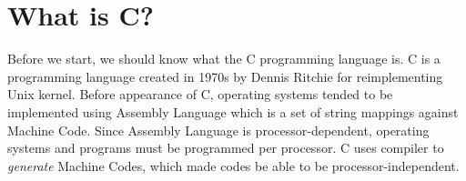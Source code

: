 \section{What is C?}

Before we start, we should know what the C programming language is. C is
a programming language created in 1970s by Dennis Ritchie for
reimplementing Unix kernel. Before appearance of C, operating systems
tended to be implemented using Assembly Language which is a set of string
mappings against Machine Code. Since Assembly Language is
processor-dependent, operating systems and programs must be programmed per
processor. C uses compiler to \emph{generate} Machine Codes, which made
codes be able to be processor-independent.
